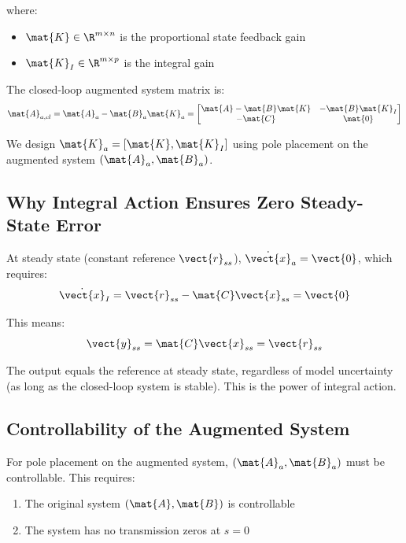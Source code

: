 where:
\begin{itemize}
    \item $\mat{K} \in \R^{m \times n}$ is the proportional state feedback gain
    \item $\mat{K}_I \in \R^{m \times p}$ is the integral gain
\end{itemize}

The closed-loop augmented system matrix is:
\begin{equation}
\mat{A}_{a,cl} = \mat{A}_a - \mat{B}_a\mat{K}_a =
\begin{bmatrix} \mat{A} - \mat{B}\mat{K} & -\mat{B}\mat{K}_I \\ -\mat{C} & \mat{0} \end{bmatrix}
\label{eq:augmented_closed_loop}
\end{equation}

We design $\mat{K}_a = [\mat{K}, \mat{K}_I]$ using pole placement on the augmented system $(\mat{A}_a, \mat{B}_a)$.

\subsection{Why Integral Action Ensures Zero Steady-State Error}

At steady state (constant reference $\vect{r}_{ss}$), $\dot{\vect{x}}_a = \vect{0}$, which requires:
\begin{equation}
\dot{\vect{x}}_I = \vect{r}_{ss} - \mat{C}\vect{x}_{ss} = \vect{0}
\end{equation}

This means:
\begin{equation}
\vect{y}_{ss} = \mat{C}\vect{x}_{ss} = \vect{r}_{ss}
\end{equation}

The output equals the reference at steady state, regardless of model uncertainty (as long as the closed-loop system is stable). This is the power of integral action.


\subsection{Controllability of the Augmented System}

For pole placement on the augmented system, $(\mat{A}_a, \mat{B}_a)$ must be controllable. This requires:
\begin{enumerate}
    \item The original system $(\mat{A}, \mat{B})$ is controllable
    \item The system has no transmission zeros at $s = 0$
\end{enumerate}

